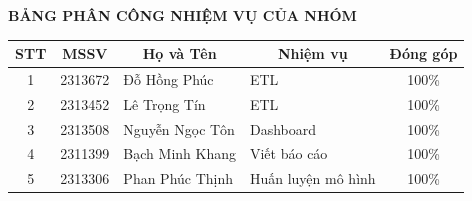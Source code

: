 \begin{center} %
    \textbf{\large BẢNG PHÂN CÔNG NHIỆM VỤ CỦA NHÓM}
\end{center}

\begin{table}[H]
    \centering
    \renewcommand{\arraystretch}{1.5} 
    \begin{tabular}{|c|c|p{4.5cm}|p{6cm}|c|}
        \hline
        \textbf{STT} & 
        \textbf{MSSV} & 
        \multicolumn{1}{c|}{\textbf{Họ và Tên}} & 
        \multicolumn{1}{c|}{\textbf{Nhiệm vụ}} & \textbf{Đóng góp} \\
        \hline
        1 & 2313672 & Đỗ Hồng Phúc & ETL & 100\%\\
        \hline
        2 & 2313452 & Lê Trọng Tín & ETL & 100\% \\
        \hline
        3 & 2313508 & Nguyễn Ngọc Tôn & Dashboard & 100\% \\
        \hline
        4 & 2311399 & Bạch Minh Khang &  Viết báo cáo & 100\% \\
        \hline
        5 & 2313306 & Phan Phúc Thịnh & Huấn luyện mô hình & 100\% \\
        \hline
    \end{tabular}
\end{table}